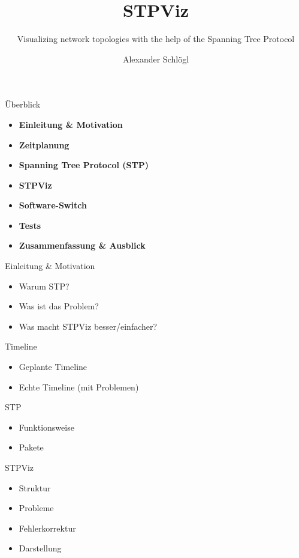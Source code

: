 \documentclass{beamer}
\title{STPViz}
\subtitle{Visualizing network topologies with the help of the Spanning Tree Protocol}
\author{Alexander Schlögl}
\begin{document}
\begin{frame}[plain]
    \maketitle
\end{frame}

\begin{frame}{Überblick}
    \begin{itemize}
        \item \textbf{Einleitung \& Motivation}
        \item \textbf{Zeitplanung}
        \item \textbf{Spanning Tree Protocol (STP)}
        \item \textbf{STPViz}
        \item \textbf{Software-Switch}
        \item \textbf{Tests}
        \item \textbf{Zusammenfassung \& Ausblick}
    \end{itemize}
\end{frame}

\begin{frame}{Einleitung \& Motivation}
    \begin{itemize}
        \item Warum STP?
        \item Was ist das Problem?
        \item Was macht STPViz besser/einfacher?
    \end{itemize}
\end{frame}

\begin{frame}{Timeline}
    \begin{itemize}
        \item Geplante Timeline
        \item Echte Timeline (mit Problemen)
    \end{itemize}
\end{frame}

\begin{frame}{STP}
    \begin{itemize}
        \item Funktionsweise
        \item Pakete
    \end{itemize}
\end{frame}

\begin{frame}{STPViz}
    \begin{itemize}
        \item Struktur
        \item Probleme
        \item Fehlerkorrektur
        \item Darstellung
    \end{itemize}
\end{frame}
\end{document}

